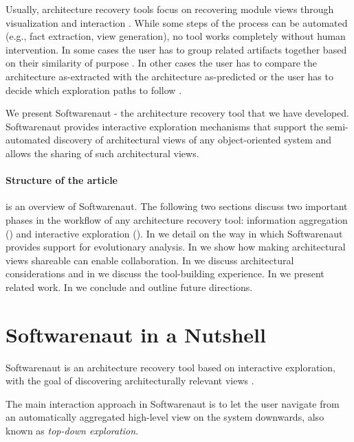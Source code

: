 \documentclass[preprint,12pt]{elsarticle}
\begin{document}
Usually, architecture recovery tools focus on recovering module views through visualization and interaction \cite{murphy-reflexion, muller-rigi, storey-shrimp}. While some steps of the process can be automated (e.g., fact extraction, view generation), no tool works completely without human intervention. In some cases the user has to group related artifacts together based on their similarity of purpose \cite{muller-rigi}. In other cases the user has to compare the architecture as-extracted with the architecture as-predicted \cite{murphy-reflexion} or the user has to decide which exploration paths to follow \cite{storey-shrimp}.

We present Softwarenaut \cite{lungu-relevo, lungu-packages} - the architecture recovery tool that we have developed. Softwarenaut provides interactive exploration mechanisms that support the semi-automated discovery of architectural views of any object-oriented system and allows the sharing of such architectural views. 

{
\paragraph{Structure of the article}  is an overview of Softwarenaut. The following two sections discuss two important phases in the workflow of any architecture recovery tool: information aggregation () and interactive exploration (). In  we detail on the way in which Softwarenaut provides support for evolutionary analysis. In  we show how making architectural views shareable can enable collaboration. In  we discuss architectural considerations and in  we discuss the tool-building experience. In  we present related work. In  we conclude and outline future directions.

}
\section {Softwarenaut in a Nutshell} \label{sec:over}

Softwarenaut is an architecture recovery tool based on interactive exploration, with the goal of discovering architecturally relevant views \cite{lungu-packages}.

The main interaction approach in Softwarenaut is to let the user navigate from an automatically aggregated high-level view on the system downwards, also known as {\em top-down exploration}.
\end{document}
